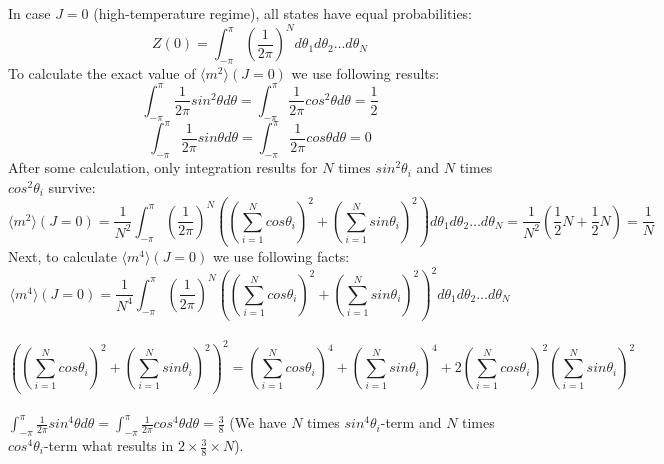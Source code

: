 In case $J=0$ (high-temperature regime), all states have equal probabilities:
\begin{equation}
\label{paritionfunction_free_zero}
Z(0) =  %
\int_{-\pi}^{\pi} (\frac{1}{2 \pi})^N   d \theta_1 d \theta_2 \dots d\theta_N 
\end{equation}
To calculate the exact value of $\langle m^2 \rangle (J=0)$  we use following results: 
\begin{equation*} 
 \int_{-\pi}^{\pi}  \frac{1}{2 \pi} sin^2 \theta d \theta =\int_{-\pi}^{\pi}  \frac{1}{2 \pi} cos^2 \theta d \theta = \frac{1}{2} 
\end{equation*}
 \begin{equation*} \int_{-\pi}^{\pi}  \frac{1}{2 \pi} sin \theta d \theta  =\int_{-\pi}^{\pi}  \frac{1}{2 \pi} cos  \theta d \theta = 0 \end{equation*}
   After some calculation, only integration results for $N$ times $sin^2 \theta_i$ and $N$ times $cos^2 \theta_i$ survive:
\begin{equation} 
\label{m2j0}
  \langle m^2 \rangle (J=0) = \frac{1}{N^2}   \int_{-\pi}^{\pi}  (\frac{1}{2 \pi})^N \left(  
   ( \sum_{i=1}^{N} cos \theta_i )^2 +  (\sum_{i=1}^{N} sin \theta_i  )^2 \right)  d \theta_1 d \theta_2 \dots d\theta_N =
  \frac{1}{N^2}  (\frac{1}{2}N +\frac{1}{2}N)   = \frac{1}{N}
\end{equation}
Next, to calculate $\langle m^4 \rangle (J=0)$ we use following facts: 
\begin{equation*}
\langle m^4 \rangle (J=0) = \frac{1}{N^4}   \int_{-\pi}^{\pi}  (\frac{1}{2 \pi})^N \left(  
( \sum_{i=1}^{N} cos \theta_i )^2 +  (\sum_{i=1}^{N} sin \theta_i  )^2 \right)^2 d \theta_1 d \theta_2 \dots d\theta_N  
\end{equation*} \\ 
\begin{equation*}
 \left(  
( \sum_{i=1}^{N} cos \theta_i )^2 +  (\sum_{i=1}^{N} sin \theta_i  )^2 \right)^2 =  (\sum_{i=1}^{N} cos \theta_i )^4 + (\sum_{i=1}^{N} sin \theta_i )^4 + 2 ( \sum_{i=1}^{N} cos \theta_i )^2( \sum_{i=1}^{N} sin \theta_i )^2 
\end{equation*} \\

$ \int_{-\pi}^{\pi}  \frac{1}{2 \pi} sin^4 \theta d \theta =\int_{-\pi}^{\pi}  \frac{1}{2 \pi} cos^4 \theta d \theta = \frac{3}{8}$ (We  have $N$ times $sin^4\theta_i$-term and $N$ times $cos^4\theta_i$-term  what results in $2\times \frac{3}{8} \times N$). \\

